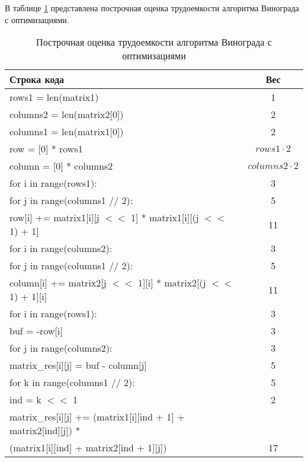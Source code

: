\begin{itemize}
    В таблице \ref{tbl:vinograd_opt} представлена построчная оценка трудоемкости алгоритма Винограда с оптимизациями.
    \begin{table}[h]
    \begin{center}
        \begin{threeparttable}
        \captionsetup{justification=raggedright}
        \caption{\label{tbl:vinograd_opt}Построчная оценка трудоемкости алгоритма Винограда с оптимизациями}
        \begin{tabular}{|l|c|}
            \hline
            Строка кода & Вес \\
            \hline
            rows1 = len(matrix1) & 1 \\ 
            \hline
            columns2 = len(matrix2[0]) & 2 \\ 
            \hline
            columns1 = len(matrix1[0]) & 2 \\ 
            \hline
            row = [0] * rows1 & $rows1 \cdot 2$ \\ 
            \hline
            column = [0] * columns2 & $columns2 \cdot 2$\\ 
            \hline
            for i in range(rows1): & 3 \\ 
            \hline
            for j in range(columns1 // 2): & 5 \\ 
            \hline
            row[i] += matrix1[i][j $<<$ 1] * matrix1[i][(j $<<$ 1) + 1] & 11 \\ 
            \hline
            for i in range(columns2): & 3 \\ 
            \hline
            for j in range(columns1 // 2): & 5 \\ 
            \hline
            column[i] += matrix2[j $<<$ 1][i] * matrix2[(j $<<$ 1) + 1][i] & 11 \\ 
            \hline
            for i in range(rows1): & 3\\ 
            \hline
            buf = -row[i] & 3 \\ 
            \hline
            for j in range(columns2): & 3 \\ 
            \hline
            matrix\_res[i][j] = buf - column[j] & 5 \\ 
            \hline
            for k in range(columns1 // 2): & 5 \\ 
            \hline
            ind = k $<<$ 1 & 2 \\ 
            \hline
            matrix\_res[i][j] += (matrix1[i][ind + 1] + matrix2[ind][j]) * & \\ (matrix1[i][ind] + matrix2[ind + 1][j]) & 17 \\ 

\end{tabular}
\end{threeparttable}
\end{center}
\end{table}
\end{itemize}
